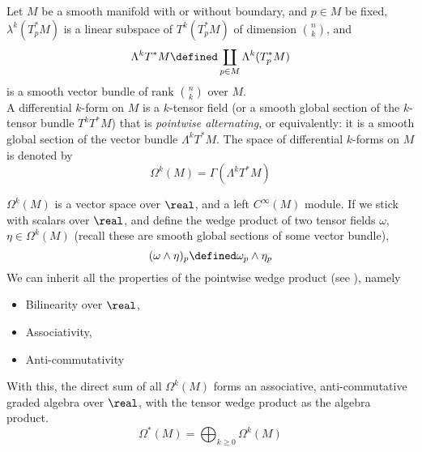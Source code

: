 \documentclass[../main-v2-manifolds.tex]{subfiles}
\begin{document}
    \begin{definition}
        Let $M$ be a smooth manifold with or without boundary, and $p\in M$ be fixed, $\lambda^k(T_p^*M)$ is a linear subspace of $T^k(T_p^*M)$ of dimension $\binom{n}{k}$, and
        \[
            \Lambda^kT^*M \defined \coprod_{p\in M}\Lambda ^k(T^*_p M)
        \]
        is a smooth vector bundle of rank $\binom{n}{k}$ over $M$. \\

        A differential $k$-form on $M$ is a $k$-tensor field (or a smooth global section of the $k$-tensor bundle $T^kT^*M$) that is \emph{pointwise alternating}, or equivalently: it is a smooth global section of the vector bundle $\Lambda^kT^*M$. The space of differential $k$-forms on $M$ is denoted by 
        \[
            \Omega^k(M) = \Gamma(\Lambda^kT^*M)
        \]
    \end{definition}
    \begin{definition}
        $\Omega^k(M)$ is a vector space over $\real$, and a left $C^\infty(M)$ module. If we stick with scalars over $\real$, and define the wedge product of two tensor fields $\omega$, $\eta\in \Omega^k(M)$ (recall these are smooth global sections of some vector bundle),
        \[
            (\omega\wedge\eta)_p\defined \omega_p\wedge\eta_p
        \]
        We can inherit all the properties of the pointwise wedge product (see ), namely \begin{itemize}
            \item Bilinearity over $\real$,
            \item Associativity,
            \item Anti-commutativity
        \end{itemize}
        With this, the direct sum of all $\Omega^k(M)$ forms an associative, anti-commutative graded algebra over $\real$, with the tensor wedge product as the algebra product.
        \[
            \Omega^*(M) = \bigoplus_{k\geq 0}\Omega^k(M)
        \]
    \end{definition}
    
\end{document}
